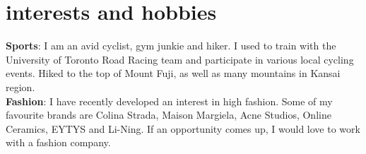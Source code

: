 \documentclass[]{cv-roald}
\begin{document}
\section*{interests and hobbies}
\textbf{Sports}: I am an avid cyclist, gym junkie and hiker. I used to train with the University of Toronto Road Racing team and participate in various local cycling events. Hiked to the top of Mount Fuji, as well as many mountains in Kansai region. \\
\textbf{Fashion}: I have recently developed an interest in high fashion. Some of my favourite brands are Colina Strada, Maison Margiela, Acne Studios, Online Ceramics, EYTYS and Li-Ning. If an opportunity comes up, I would love to work with a fashion company.
\end{document}
